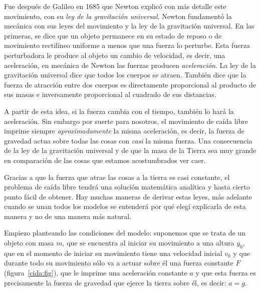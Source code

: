Fue después de Galileo en 1685 que Newton explicó con más detalle este movimiento, con su \emph{ley de la gravitación universal}. Newton fundamentó la mecánica con sus leyes del movimiento y la ley de la gravitación universal. En las primeras, se dice que un objeto permanece en su estado de reposo o de movimiento rectilíneo uniforme a menos que una fuerza lo perturbe. Esta fuerza perturbadora le produce al objeto un cambio de velocidad, es decir, una aceleración, en mecánica de Newton las fuerzas producen \emph{aceleración}. La ley de la gravitación universal dice que todos los cuerpos se atraen. También dice que la fuerza de atracción entre dos cuerpos es directamente proporcional al producto de sus masas e inversamente proporcional al cuadrado de sus distancias.

A partir de esta idea, si la fuerza cambia con el tiempo, también lo hará la aceleración. Sin embargo por suerte para nosotros, el movimiento de caída libre imprime siempre \emph{aproximadamente} la misma aceleración, es decir, la fuerza de gravedad actua sobre todas las cosas con \emph{casi} la misma fuerza. Una consecuencia de la ley de la gravitación universal y de que la masa de la Tierra sea muy grande en comparación de las cosas que estamos acostumbrados ver caer.

Gracias a que la fuerza que atrae las cosas a la tierra es casi constante, el problema de caída libre tendrá una solución matemática analítica y hasta cierto punto fácil de obtener. Hay muchas maneras de derivar estas leyes, más adelante cuando se unan todos los modelos se entenderá por qué elegí explicarla de esta manera y no de una manera más natural.

Empiezo planteando las condiciones del modelo: suponemos que se trata de un objeto con masa $m$, que se encuentra al iniciar su movimiento a una altura $y_0$, que en el momento de iniciar su movimiento tiene una velocidad inicial $v_0$ y que durante todo su movimiento sólo va a actuar sobre él una fuerza constante $F$ (figura~\ref{cida:fig}), que le imprime una aceleración constante $a$ y que esta fuerza es precisamente la fuerza de gravedad que ejerce la tierra sobre él, es decir: $a = g$.


